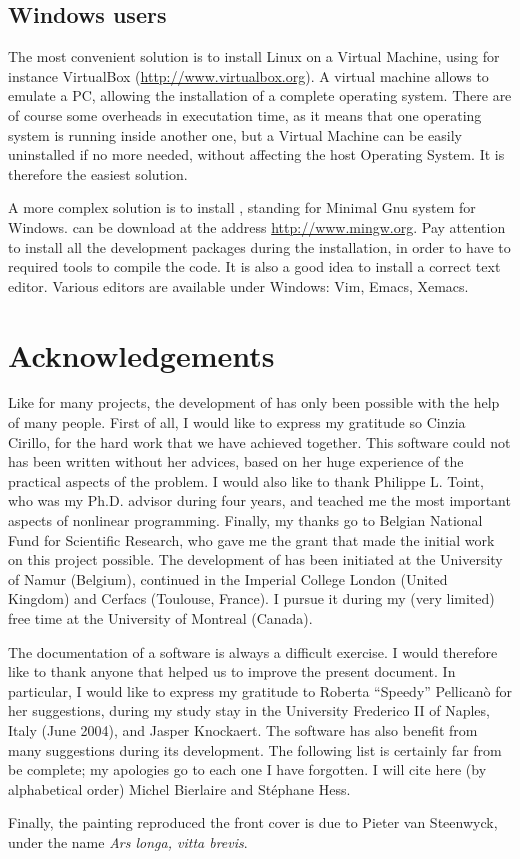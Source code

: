 \subsection{Windows users}
\label{sec:Windows}

The most convenient solution is to install Linux on a Virtual Machine, using for instance VirtualBox (\url{http://www.virtualbox.org}).
A virtual machine allows to emulate a PC, allowing the installation of a complete operating system.
There are of course some overheads in executation time, as it means that one operating system is running inside another one, but a Virtual Machine can be easily uninstalled if no more needed, without affecting the host Operating System.
It is therefore the easiest solution.

A more complex solution is to install \mingw{}, standing for Minimal Gnu system for Windows.
\mingw{} can be download at the address \url{http://www.mingw.org}.
Pay attention to install all the development packages during the installation, in order to have to required tools to compile the code.
It is also a good idea to install a correct text editor. Various
editors are available under Windows: \textsf{Vim}, \textsf{Emacs},
\textsf{Xemacs}.

\section{Acknowledgements}

Like for many projects, the development of \amlet{} has only been
possible with the help of many people.
First of all, I would like to express my gratitude so Cinzia Cirillo,
for the hard work that we have achieved together. This software could
not has been written without her advices, based on her huge experience
of the practical aspects of the problem. I would also like to thank
Philippe L. Toint, who was my Ph.D. advisor during four years, and
teached me the most important aspects of nonlinear
programming. Finally, my thanks go to Belgian National Fund for
Scientific Research, who gave me the grant that made the initial work
on this project possible.
The development of \amlet{} has been
initiated at the University of Namur (Belgium), continued in the
Imperial College London (United Kingdom) and Cerfacs (Toulouse, France).
I pursue it during my (very limited) free time at the University of Montreal (Canada).

The documentation of a software is always a difficult exercise. I
would therefore like to thank anyone that helped us to improve the
present document. In particular, I would like to express my
gratitude to Roberta ``Speedy'' Pellican\`o for her suggestions,
during my study stay in the University Frederico II of Naples, Italy
(June 2004), and Jasper Knockaert.
The software has also benefit from many suggestions during its
development. The following list is certainly far from be complete; my
apologies go to each one I have forgotten. I will cite here (by
alphabetical order) Michel Bierlaire and St\'e{}phane Hess.

Finally, the painting reproduced the front cover is due to Pieter van
Steenwyck, under the name {\sl Ars longa, vitta brevis}.


